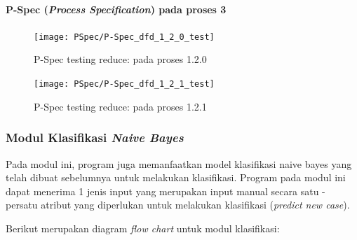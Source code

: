\paragraph{P-Spec (\textit{Process Specification}) pada proses 3}

\begin{figure}[H]
	\centering
	\texttt{[image: PSpec/P-Spec\_dfd\_1\_2\_0\_test]}
	\caption[P-Spec testing reduce: pada proses 1.2.0]{P-Spec testing reduce: pada proses 1.2.0}
	\label{fig:P-Spec testing reduce: pada proses 1.2.0}
\end{figure}

\begin{figure}[H]
	\centering
	\texttt{[image: PSpec/P-Spec\_dfd\_1\_2\_1\_test]}
	\caption[P-Spec testing reduce: pada proses 1.2.1]{P-Spec testing reduce: pada proses 1.2.1}
	\label{fig:P-Spec testing reduce: pada proses 1.2.1}
\end{figure}


\subsubsection{Modul Klasifikasi \textit{Naive Bayes}}

Pada modul ini, program juga memanfaatkan model klasifikasi naive bayes yang telah dibuat sebelumnya untuk melakukan klasifikasi. Program pada modul ini dapat menerima 1 jenis input yang merupakan input manual secara satu - persatu atribut yang diperlukan untuk melakukan klasifikasi (\textit{predict new case}).

Berikut merupakan diagram \textit{flow chart} untuk modul klasifikasi:

